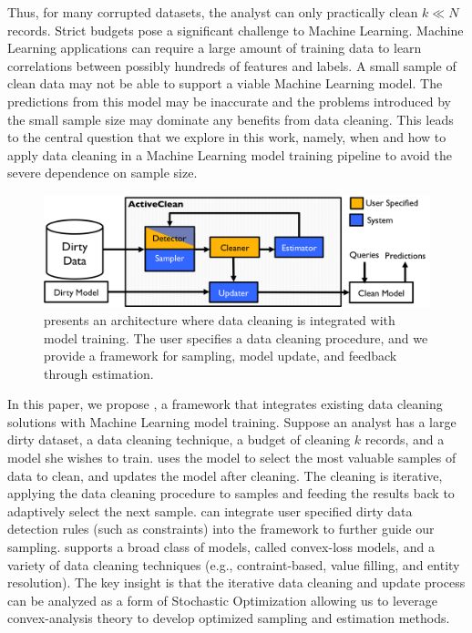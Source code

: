 Thus, for many corrupted datasets, the analyst can only practically clean $k \ll N$ records.
Strict budgets pose a significant challenge to Machine Learning.
Machine Learning applications can require a large amount of training data to learn correlations between possibly hundreds of features and labels.
A small sample of clean data may not be able to support a viable Machine Learning model.
The predictions from this model may be inaccurate and the problems introduced by the small sample size may dominate any benefits from data cleaning. 
This leads to the central question that we explore in this work, namely, when and how to apply data cleaning in a Machine Learning model training pipeline to avoid the severe dependence on sample size.

\begin{figure}[t]
\centering
 \includegraphics[width=\columnwidth]{figs/arch.png}
 \caption{\sysfull presents an architecture where data cleaning is integrated with model training. The user specifies a data cleaning procedure, and we provide a framework for sampling, model update, and feedback through estimation. \label{sys-arch}}\vspace{-2em}
\end{figure}

In this paper, we propose \sys, a framework that integrates existing data cleaning solutions with Machine Learning model training.
Suppose an analyst has a large dirty dataset, a data cleaning technique, a budget of cleaning $k$ records, and a model she wishes to train.
\sys uses the model to select the most valuable samples of data to clean, and updates the model after cleaning.
The cleaning is iterative, applying the data cleaning procedure to samples and feeding the results back to adaptively select the next sample. 
\sys can integrate user specified dirty data detection rules (such as constraints) into the framework to further guide our sampling.
\sys supports a broad class of models, called convex-loss models, and a variety of data cleaning techniques (e.g., contraint-based, value filling, and entity resolution).
The key insight is that the iterative data cleaning and update process can be analyzed as a form of Stochastic Optimization \cite{bertsekas2011incremental} allowing us to leverage convex-analysis theory to develop optimized sampling and estimation methods.


